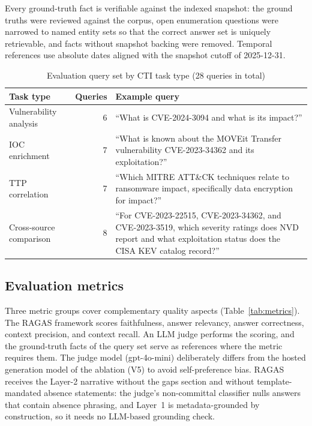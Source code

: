Every ground-truth fact is verifiable against the indexed snapshot: the
ground truths were reviewed against the corpus, open enumeration
questions were narrowed to named entity sets so that the correct answer
set is uniquely retrievable, and facts without snapshot backing were
removed. Temporal references use absolute dates aligned with the snapshot
cutoff of 2025-12-31.

\begin{table}[H]
    \centering
    \small
    \begin{tabular}{lrp{}}
        \toprule
        \textbf{Task type} & \textbf{Queries} & \textbf{Example query} \\
        \midrule
        Vulnerability analysis & 6 & ``What is CVE-2024-3094 and what is
            its impact?'' \\
        IOC enrichment & 7 & ``What is known about the MOVEit Transfer
            vulnerability CVE-2023-34362 and its exploitation?'' \\
        TTP correlation & 7 & ``Which MITRE ATT\&CK techniques relate to
            ransomware impact, specifically data encryption for
            impact?'' \\
        Cross-source comparison & 8 & ``For CVE-2023-22515,
            CVE-2023-34362, and CVE-2023-3519, which severity ratings
            does NVD report and what exploitation status does the CISA
            KEV catalog record?'' \\
        \bottomrule
    \end{tabular}
    \caption{Evaluation query set by CTI task type (28 queries in total)}
    \label{tab:query-set}
\end{table}

\subsection{Evaluation metrics}
\label{sec:ragas-metrics}

Three metric groups cover complementary quality aspects
(Table~\ref{tab:metrics}). The RAGAS framework \parencite{es2023ragas}
scores faithfulness, answer relevancy, answer correctness, context
precision, and context recall. An LLM judge performs the scoring, and the
ground-truth facts of the query set serve as references where the metric
requires them. The judge model (gpt-4o-mini) deliberately differs from
the hosted generation model of the ablation (V5) to avoid self-preference
bias. RAGAS receives the Layer-2 narrative without the gaps section and
without template-mandated absence statements: the judge's non-committal
classifier nulls answers that contain absence phrasing, and Layer~1 is
metadata-grounded by construction, so it needs no LLM-based grounding
check. %

